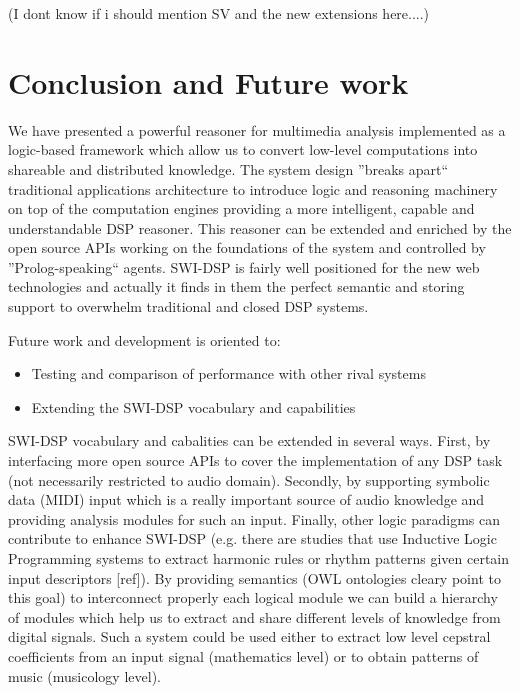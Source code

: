 \documentclass[runningheads]{llncs}
\begin{document}
(I dont know if i should mention SV and the new extensions here....)

\section{Conclusion and Future work}\label{sec:conclusion}

We have presented a powerful reasoner for multimedia analysis implemented as a logic-based framework which allow us to convert low-level computations into shareable and distributed knowledge. The system design ''breaks apart`` traditional applications architecture to introduce logic and reasoning machinery on top of the computation engines providing a more intelligent, capable and understandable DSP reasoner. This reasoner can be extended and enriched by the open source APIs working on the foundations of the system and controlled by ''Prolog-speaking`` agents. SWI-DSP is fairly well positioned for the new web technologies and actually it finds in them the perfect semantic and storing support to overwhelm traditional and closed DSP systems.

Future work and development is oriented to:

\begin{itemize}
 \item Testing and comparison of performance with other rival systems
 \item Extending the SWI-DSP vocabulary and capabilities
\end{itemize}

SWI-DSP vocabulary and cabalities can be extended in several ways. First, by interfacing more open source APIs to cover the implementation of any DSP task (not necessarily restricted to audio domain). Secondly, by supporting symbolic data (MIDI) input which is a really important source of audio knowledge and providing analysis modules for such an input. Finally, other logic paradigms can contribute to enhance SWI-DSP (e.g. there are studies that use Inductive Logic Programming systems to extract harmonic rules or rhythm patterns given certain input descriptors [ref]). By providing semantics (OWL ontologies cleary point to this goal) to interconnect properly each logical module we can build a hierarchy of modules which help us to extract and share different levels of knowledge from digital signals. Such a system could be used either to extract low level cepstral coefficients from an input signal (mathematics level) or to obtain patterns of music (musicology level). 
\end{document}
